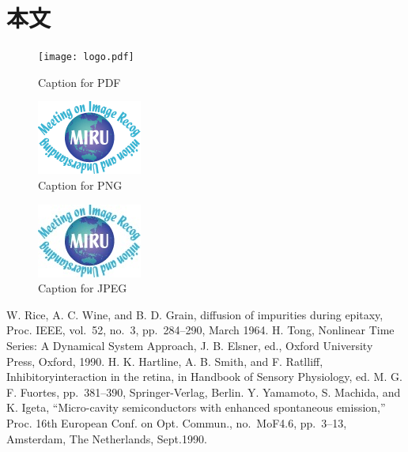 \documentclass[MIRU,submit,uplatex]{miru2023j}
\begin{document}
\section{本文}

\begin{figure}[h]
    \centering
    \texttt{[image: logo.pdf]}
    \caption{Caption for PDF}
    \label{fig:my_label1}
\end{figure}

\begin{figure}[h]
    \centering
    \includegraphics[width=.3\linewidth]{logo.png}
    \caption{Caption for PNG}
    \label{fig:my_label2}
\end{figure}

\begin{figure}[h]
    \centering
    \includegraphics[width=.3\linewidth]{logo.jpg}
    \caption{Caption for JPEG}
    \label{fig:my_label3}
\end{figure}

%

%
%

\begin{thebibliography}{9}%
W. Rice, A. C. Wine, and B. D. Grain,
diffusion of impurities during epitaxy,
Proc. IEEE, vol.~52, no.~3, pp.~284--290, March 1964.
 H. Tong, Nonlinear Time Series: A Dynamical System Approach, J. B. Elsner, ed., Oxford University Press, Oxford, 1990.
H. K. Hartline, A. B. Smith, and F. Ratlliff,
Inhibitoryinteraction in the retina,
in Handbook of Sensory Physiology,
ed. M. G. F. Fuortes, pp.~381--390, Springer-Verlag, Berlin.
Y. Yamamoto, S. Machida, and K. Igeta,
``Micro-cavity semiconductors with enhanced spontaneous emission,''
Proc. 16th European Conf. on Opt. Commun.,
no.~MoF4.6, pp.~3--13, Amsterdam, The Netherlands, Sept.1990.
\end{thebibliography}
\end{document}
